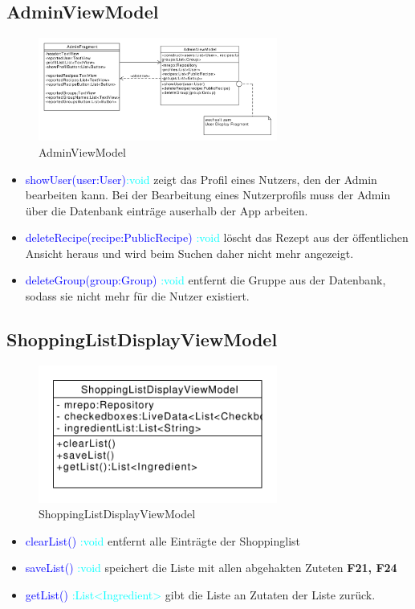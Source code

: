 \subsection{AdminViewModel}
\begin{figure}[H]
	\centering
	\includegraphics[width=0.7\textwidth]{pics/viewModel/Admin_ViewModel.pdf}%
	\caption{AdminViewModel}%
	\label{viewModel}%
\end{figure}
\begin{itemize}
	\item \textcolor{blue}{showUser(user:User)}\textcolor{cyan}{:void}
	zeigt das Profil eines Nutzers, den der Admin bearbeiten kann. Bei der Bearbeitung eines Nutzerprofils muss der Admin über die Datenbank einträge auserhalb der App arbeiten.
	\item \textcolor{blue}{deleteRecipe(recipe:PublicRecipe)} \textcolor{cyan}{:void} löscht das Rezept aus der öffentlichen Ansicht heraus und wird beim Suchen daher nicht mehr angezeigt.
	\item \textcolor{blue}{deleteGroup(group:Group)} \textcolor{cyan}{:void} entfernt die Gruppe aus der Datenbank, sodass sie nicht mehr für die Nutzer existiert.
\end{itemize}


\subsection{ShoppingListDisplayViewModel}
\begin{figure}[H]
	\centering
	\includegraphics[width=0.7\textwidth]{pics/viewModel/Shopping_List_ViewModel.pdf}%
	\caption{ShoppingListDisplayViewModel}%
	\label{viewModel}%
\end{figure}
\begin{itemize}
	\item \textcolor{blue}{clearList()} \textcolor{cyan}{:void}
	entfernt alle Einträgte der Shoppinglist
	\item \textcolor{blue}{saveList()} \textcolor{cyan}{:void} speichert die Liste mit allen abgehakten Zuteten \textbf{F21, F24}
	\item \textcolor{blue}{getList()} \textcolor{cyan}{:List<Ingredient>} gibt die Liste an Zutaten der Liste zurück.
\end{itemize}

